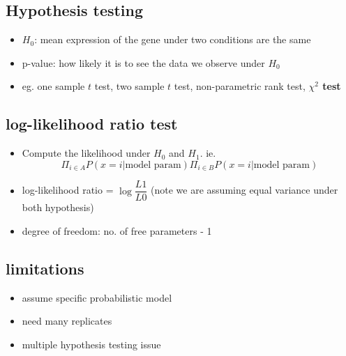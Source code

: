 \documentclass[font=12pt]{article}
\begin{document}
\subsection{Hypothesis testing}
\begin{itemize}
	\item $ H_0 $: mean expression of the gene under two conditions are the same
	\item p-value: how likely it is to see the data we observe under $ H_0 $
	\item eg. one sample $ t $ test, two sample $ t $ test, non-parametric rank test, \textbf{$\chi^2$ test}
\end{itemize}
\subsection{log-likelihood ratio test}
\begin{itemize}
	\item Compute the likelihood under $ H_0 $ and $ H_1 $. ie. $$ \Pi_{i\in A} P(x=i | \text{model param}) \Pi_{i\in B} P(x=i | \text{model param}) $$
	\item log-likelihood ratio = $ \log\dfrac{L1}{L0} $ (note we are assuming equal variance under both hypothesis)
	\item degree of freedom: no. of free parameters - 1
\end{itemize}
\subsection{limitations}
\begin{itemize}
	\item assume specific probabilistic model
	\item need many replicates
	\item multiple hypothesis testing issue
\end{itemize}
\end{document}
